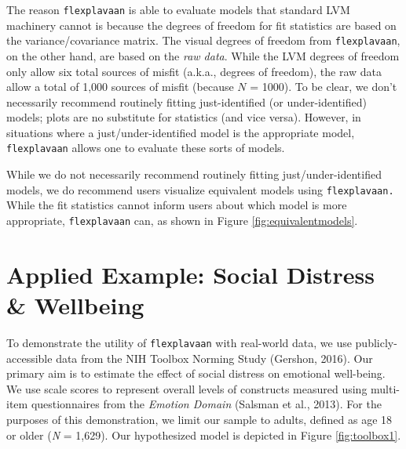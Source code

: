 \documentclass[
  english,
  man]{apa6}
\begin{document}
The reason \texttt{flexplavaan} is able to evaluate models that standard LVM machinery cannot is because the degrees of freedom for fit statistics are based on the variance/covariance matrix. The visual degrees of freedom from \texttt{flexplavaan}, on the other hand, are based on the \emph{raw data}. While the LVM degrees of freedom only allow six total sources of misfit (a.k.a., degrees of freedom), the raw data allow a total of 1,000 sources of misfit (because \(N\) = 1000). To be clear, we don't necessarily recommend routinely fitting just-identified (or under-identified) models; plots are no substitute for statistics (and vice versa). However, in situations where a just/under-identified model is the appropriate model, \texttt{flexplavaan} allows one to evaluate these sorts of models.

While we do not necessarily recommend routinely fitting just/under-identified models, we do recommend users visualize equivalent models using \texttt{flexplavaan.} While the fit statistics cannot inform users about which model is more appropriate, \texttt{flexplavaan} can, as shown in Figure \ref{fig:equivalentmodels}.

\hypertarget{applied-example-social-distress-wellbeing}{%
\section{Applied Example: Social Distress \& Wellbeing}\label{applied-example-social-distress-wellbeing}}

To demonstrate the utility of \texttt{flexplavaan} with real-world data, we use publicly-accessible data from the NIH Toolbox Norming Study (Gershon, 2016). Our primary aim is to estimate the effect of social distress on emotional well-being. We use scale scores to represent overall levels of constructs measured using multi-item questionnaires from the \emph{Emotion Domain} (Salsman et al., 2013). For the purposes of this demonstration, we limit our sample to adults, defined as age 18 or older (\emph{N} = 1,629). Our hypothesized model is depicted in Figure \ref{fig:toolbox1}.
\end{document}
